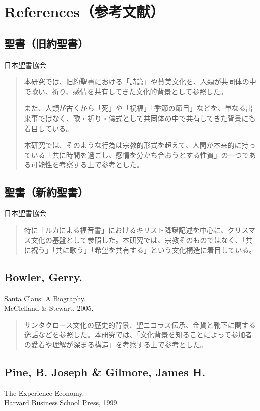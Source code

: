 \section*{References（参考文献）}

\subsection*{聖書（旧約聖書）}
\noindent 日本聖書協会

\begin{quote}
本研究では、旧約聖書における「詩篇」や賛美文化を、人類が共同体の中で歌い、祈り、感情を共有してきた文化的背景として参照した。

また、人類が古くから「死」や「祝福」「季節の節目」などを、単なる出来事ではなく、歌・祈り・儀式として共同体の中で共有してきた背景にも着目している。

本研究では、そのような行為は宗教的形式を超えて、人間が本来的に持っている「共に時間を過ごし、感情を分かち合おうとする性質」の一つである可能性を考察する上で参考とした。
\end{quote}

\subsection*{聖書（新約聖書）}
\noindent 日本聖書協会

\begin{quote}
特に「ルカによる福音書」におけるキリスト降誕記述を中心に、クリスマス文化の基盤として参照した。本研究では、宗教そのものではなく、「共に祝う」「共に歌う」「希望を共有する」という文化構造に着目している。
\end{quote}

\subsection*{Bowler, Gerry.}
\noindent Santa Claus: A Biography.\\McClelland \& Stewart, 2005.

\begin{quote}
サンタクロース文化の歴史的背景、聖ニコラス伝承、金貨と靴下に関する逸話などを参照した。本研究では、「文化背景を知ることによって参加者の愛着や理解が深まる構造」を考察する上で参考とした。
\end{quote}

\subsection*{Pine, B. Joseph \& Gilmore, James H.}
\noindent The Experience Economy.\\Harvard Business School Press, 1999.

